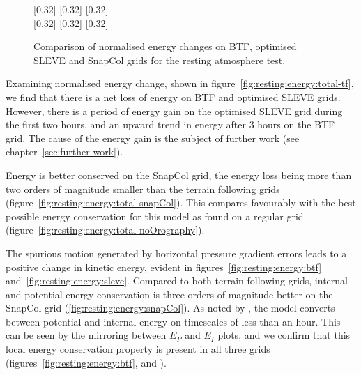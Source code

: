 \begin{figure}
	\captionsetup[subfigure]{position=b}
	\centering
	[0.32\textwidth]{}
	\hfill
	[0.32\textwidth]{}
	\hfill
	[0.32\textwidth]{}
	\\
	[0.32\textwidth]{}
	\hfill
	[0.32\textwidth]{}
	\hfill
	[0.32\textwidth]{}
	\caption{Comparison of normalised energy changes on BTF, optimised SLEVE and SnapCol grids for the resting atmosphere test.}
	\label{fig:resting:energy}
\end{figure}

Examining normalised energy change, shown in figure~\ref{fig:resting:energy:total-tf}, we find that there is a net loss of energy on BTF and optimised SLEVE grids.  However, there is a period of energy gain on the optimised SLEVE grid during the first two hours, and an upward trend in energy after 3 hours on the BTF grid.  The cause of the energy gain is the subject of further work (see chapter~\ref{sec:further-work}).

Energy is better conserved on the SnapCol grid, the energy loss being more than two orders of magnitude smaller than the terrain following grids (figure~\ref{fig:resting:energy:total-snapCol}).  This compares favourably with the best possible energy conservation for this model as found on a regular grid (figure~\ref{fig:resting:energy:total-noOrography}).

The spurious motion generated by horizontal pressure gradient errors leads to a positive change in kinetic energy, evident in figures~\ref{fig:resting:energy:btf} and~\ref{fig:resting:energy:sleve}.  Compared to both terrain following grids, internal and potential energy conservation is three orders of magnitude better on the SnapCol grid (\ref{fig:resting:energy:snapCol}).  As noted by \textcite{weller-shahrokhi2014}, the model converts between potential and internal energy on timescales of less than an hour.  This can be seen by the mirroring between $E_P$ and $E_I$ plots, and we confirm that this local energy conservation property is present in all three grids (figures~\ref{fig:resting:energy:btf},  and ).



